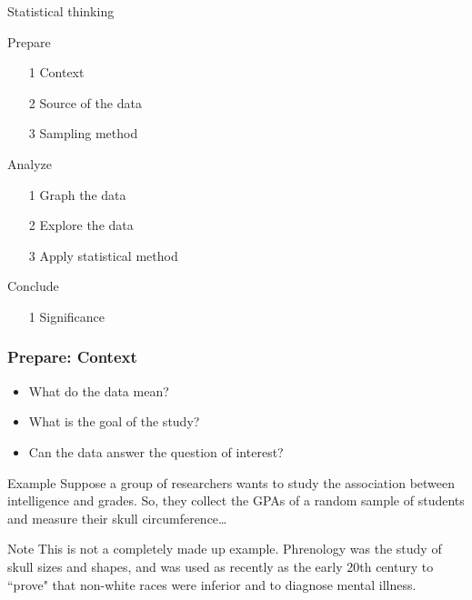 \documentclass[xcolor=table, handout]{beamer}
\begin{document}
\begin{frame}{Statistical thinking}

\begin{block}{Prepare}
\begin{itemize}
\item [1] Context
\item [2] Source of the data
\item [3] Sampling method
\end{itemize}
\end{block}

\begin{block}{Analyze}
\begin{itemize}
\item [1] Graph the data
\item [2] Explore the data
\item [3] Apply statistical method
\end{itemize}
\end{block}

\begin{block}{Conclude}
\begin{itemize}
\item [1] Significance
\end{itemize}
\end{block}

\end{frame}

\begin{frame}
\frametitle{Prepare: Context}
\begin{block}{}
\begin{itemize}
\item What do the data mean?
\item What is the goal of the study?
\item Can the data answer the question of interest?
\end{itemize}
\end{block}

\pause
\begin{exampleblock}{Example}
Suppose a group of researchers wants to study the association between intelligence and grades. So, they collect the GPAs of a random sample of students and measure their skull circumference\ldots\\
\end{exampleblock}
\pause
\begin{alertblock}{Note}
This is not a completely made up example. Phrenology was the study of skull sizes and shapes, and was used as recently as the early 20th century to ``prove" that non-white races were inferior and to diagnose mental illness.
\end{alertblock}
\end{frame}
\end{document}
